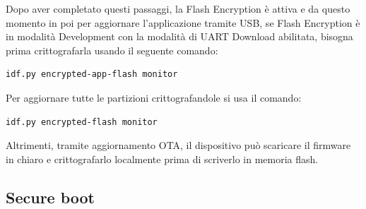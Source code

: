 \documentclass[a4paper]{article}
\begin{document}
Dopo aver completato questi passaggi, la Flash Encryption è attiva e da questo momento
in poi per aggiornare l'applicazione tramite USB,
se Flash Encryption è in modalità Development con la modalità di UART Download abilitata,
bisogna prima crittografarla usando il seguente comando:
\begin{lstlisting}
idf.py encrypted-app-flash monitor
\end{lstlisting}
Per aggiornare tutte le partizioni crittografandole si usa il comando:
\begin{lstlisting}
idf.py encrypted-flash monitor
\end{lstlisting}
    Altrimenti, tramite aggiornamento OTA, il dispositivo può scaricare il firmware 
    in chiaro e crittografarlo localmente prima di scriverlo in memoria flash.

\subsection{Secure boot}
\end{document}
